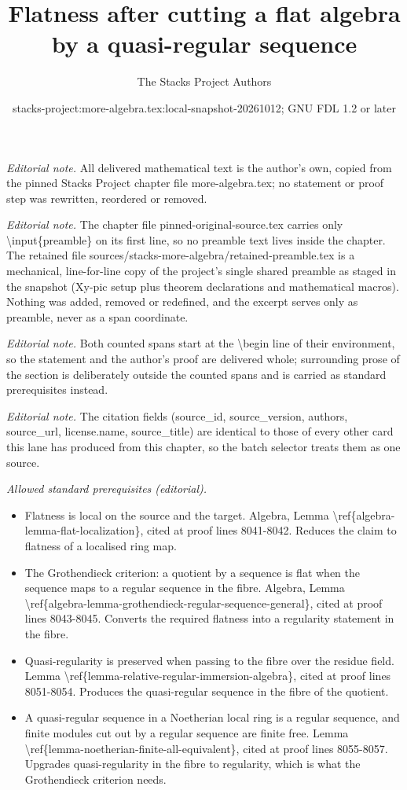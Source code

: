 \documentclass[10pt,a4paper]{amsart}
\title{Flatness after cutting a flat algebra by a quasi-regular sequence}
\author{The Stacks Project Authors}
\date{stacks-project:more-algebra.tex:local-snapshot-20261012; GNU FDL 1.2 or later}
\theoremstyle{plain}
\theoremstyle{definition}
\theoremstyle{remark}
\numberwithin{equation}{subsection}
\begin{document}
\maketitle
\setcounter{subsection}{1}
\noindent\textit{Editorial note.} All delivered mathematical text is the author's own, copied from the pinned Stacks Project chapter file more-algebra.tex; no statement or proof step was rewritten, reordered or removed.\par\medskip
\noindent\textit{Editorial note.} The chapter file pinned-original-source.tex carries only \textbackslash{}input\{preamble\} on its first line, so no preamble text lives inside the chapter. The retained file sources/stacks-more-algebra/retained-preamble.tex is a mechanical, line-for-line copy of the project's single shared preamble as staged in the snapshot (Xy-pic setup plus theorem declarations and mathematical macros). Nothing was added, removed or redefined, and the excerpt serves only as preamble, never as a span coordinate.\par\medskip
\noindent\textit{Editorial note.} Both counted spans start at the \textbackslash{}begin line of their environment, so the statement and the author's proof are delivered whole; surrounding prose of the section is deliberately outside the counted spans and is carried as standard prerequisites instead.\par\medskip
\noindent\textit{Editorial note.} The citation fields (source\_id, source\_version, authors, source\_url, license.name, source\_title) are identical to those of every other card this lane has produced from this chapter, so the batch selector treats them as one source.\par\medskip
\noindent\textit{Allowed standard prerequisites (editorial).}\begin{itemize}
\item Flatness is local on the source and the target. Algebra, Lemma \textbackslash{}ref\{algebra-lemma-flat-localization\}, cited at proof lines 8041-8042. Reduces the claim to flatness of a localised ring map.
\item The Grothendieck criterion: a quotient by a sequence is flat when the sequence maps to a regular sequence in the fibre. Algebra, Lemma \textbackslash{}ref\{algebra-lemma-grothendieck-regular-sequence-general\}, cited at proof lines 8043-8045. Converts the required flatness into a regularity statement in the fibre.
\item Quasi-regularity is preserved when passing to the fibre over the residue field. Lemma \textbackslash{}ref\{lemma-relative-regular-immersion-algebra\}, cited at proof lines 8051-8054. Produces the quasi-regular sequence in the fibre of the quotient.
\item A quasi-regular sequence in a Noetherian local ring is a regular sequence, and finite modules cut out by a regular sequence are finite free. Lemma \textbackslash{}ref\{lemma-noetherian-finite-all-equivalent\}, cited at proof lines 8055-8057. Upgrades quasi-regularity in the fibre to regularity, which is what the Grothendieck criterion needs.
\end{itemize}\medskip
\end{document}
